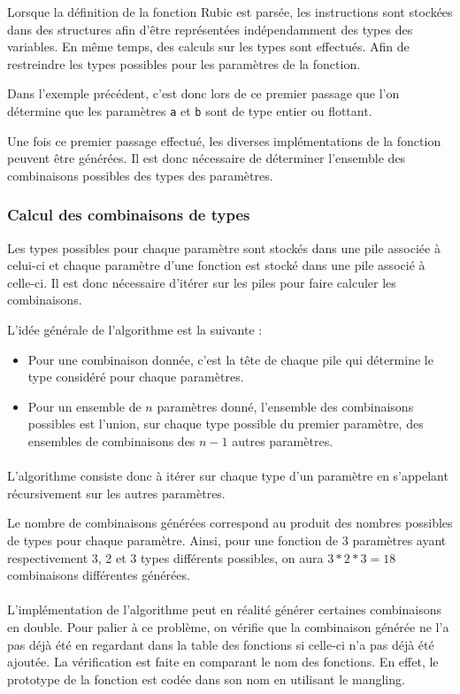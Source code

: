 \documentclass[12pt]{article}
\begin{document}
Lorsque la définition de la fonction Rubic est parsée, les instructions sont
stockées dans des structures afin d'être représentées indépendamment des types
des variables. En même temps, des calculs sur les types sont effectués. Afin
de restreindre les types possibles pour les paramètres de la fonction.

Dans l'exemple précédent, c'est donc lors de ce premier passage que l'on
détermine que les paramètres \verb!a! et \verb!b! sont de type entier ou
flottant.

Une fois ce premier passage effectué, les diverses implémentations de la
fonction peuvent être générées. Il est donc nécessaire de déterminer
l'ensemble des combinaisons possibles des types des paramètres.

\subsubsection{Calcul des combinaisons de types}

Les types possibles pour chaque paramètre sont stockés dans une pile associée à celui-ci et chaque paramètre d'une fonction est stocké dans une pile associé à celle-ci. Il est donc nécessaire d'itérer sur les piles pour faire calculer les combinaisons.

L'idée générale de l'algorithme est la suivante :
\begin{itemize}
	\item Pour une combinaison donnée, c'est la tête de chaque pile qui détermine le type considéré pour chaque paramètres.
	\item Pour un ensemble de $n$ paramètres donné, l'ensemble des combinaisons possibles est l'union, sur chaque type possible du premier paramètre, des ensembles de combinaisons des $n-1$ autres paramètres.
\end{itemize}

\paragraph{}L'algorithme consiste donc à itérer sur chaque type d'un paramètre en s'appelant récursivement sur les autres paramètres.

Le nombre de combinaisons générées correspond au produit des nombres possibles de types pour chaque paramètre. Ainsi, pour une fonction de 3 paramètres ayant respectivement 3, 2 et 3 types différents possibles, on aura $3 * 2 * 3 = 18$ combinaisons différentes générées.

\paragraph{}L'implémentation de l'algorithme peut en réalité générer certaines combinaisons en double. Pour palier à ce problème, on vérifie que la combinaison générée ne l'a pas déjà été en regardant dans la table des fonctions si celle-ci n'a pas déjà été ajoutée. La vérification est faite en comparant le nom des fonctions. En effet, le prototype de la fonction est codée dans son nom en utilisant le mangling.
\end{document}
